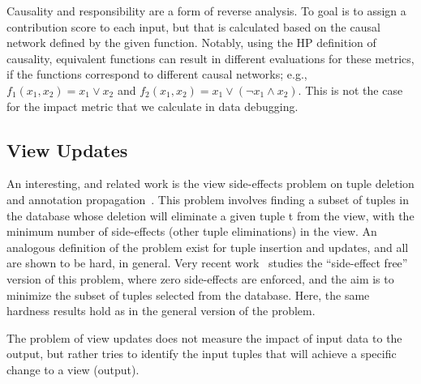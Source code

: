 Causality and responsibility are a form of reverse analysis. To goal is to assign a contribution score to each input, but that is calculated based on the causal network defined by the given function. Notably, using the HP definition of causality, equivalent functions can result in different evaluations for these metrics, if the functions correspond to different causal networks; e.g., $f_1(x_1,x_2) = x_1\vee x_2$ and $f_2(x_1,x_2) = x_1\vee (\neg x_1\wedge x_2)$. This is not the case for the impact metric that we calculate in data debugging.



\subsection*{View Updates}
An interesting, and related work is the view side-effects problem on tuple deletion and annotation propagation~\cite{DBLP:conf/pods/BunemanKT02}. This problem involves finding a subset of tuples in the database whose deletion will eliminate a given tuple t from the view, with the minimum number of side-effects (other tuple eliminations) in the view. An analogous definition of the problem exist for tuple insertion and updates, and all are shown to be hard, in general. Very recent work~\cite{cong2010} studies the ``side-effect free'' version of this problem, where zero side-effects are enforced, and the aim is to minimize the subset of tuples selected from the database. Here, the same hardness results hold as in the general version of the problem.

The problem of view updates does not measure the impact of input data to the output, but rather tries to identify the input tuples that will achieve a specific change to a view (output).


